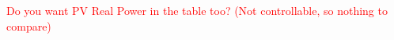 \documentclass[../../outputs/main.tex]{subfiles}
\begin{document}

\textcolor{red}{Do you want PV Real Power in the table too? (Not controllable, so nothing to compare)}
\end{document}
